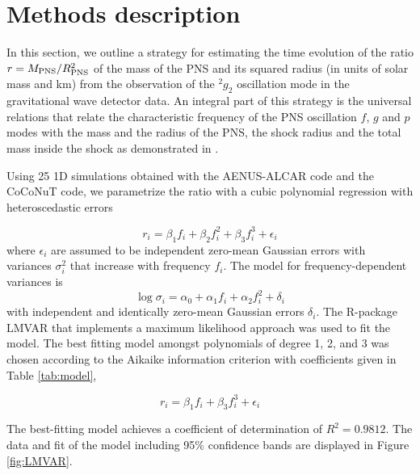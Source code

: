 \section{Methods description}
\label{methods}

In this section, we outline a strategy for estimating the time evolution of the
ratio $r=M_{\rm PNS}/R_{\rm PNS}^2$ of the mass of the PNS and its squared radius
(in units of solar mass and km) from the observation of the $\mbox{}^2g_2$
oscillation mode in the gravitational wave detector data.
An integral part of this strategy is the universal relations that relate the
characteristic frequency of the PNS oscillation $f$, $g$ and $p$ modes with the mass
and the radius of the PNS, the shock radius and the total mass inside the shock as
demonstrated in \cite{Torres:2019}.

Using 25 1D simulations obtained with the {\sc AENUS-ALCAR }code \cite{} and the
{\sc CoCoNuT} \cite{} code, we parametrize the ratio with a cubic polynomial
regression with heteroscedastic errors

\begin{equation}
r_i=\beta_1 f_i + \beta_2 f_i^2 +\beta_3 f_i^3 + \epsilon_i
\end{equation}
where $\epsilon_i$ are assumed to be independent zero-mean Gaussian errors with
variances $\sigma_i^2$ that increase with frequency $f_i$. The model for frequency-dependent
variances is
\begin{equation}
\log \sigma_i=\alpha_0+ \alpha_1 f_i + \alpha_2 f_i^2 + \delta_i
\end{equation}
with independent and identically zero-mean Gaussian errors $\delta_i$. The R-package LMVAR
\cite{lmvar:2019} that implements a maximum likelihood approach was used to fit the model.
The best fitting model amongst polynomials of degree 1, 2, and 3  was chosen according to
the Aikaike information criterion with coefficients given in Table \ref{tab:model},

\begin{equation}\label{eq:universal}
r_i = \beta_1 f_i + \beta_3 f_i^3 + \epsilon_i
\end{equation}

The best-fitting model achieves a coefficient of determination of $R^2=0.9812$.
The data and fit of the model including 95\% confidence bands are displayed in
Figure \ref{fig:LMVAR}.

